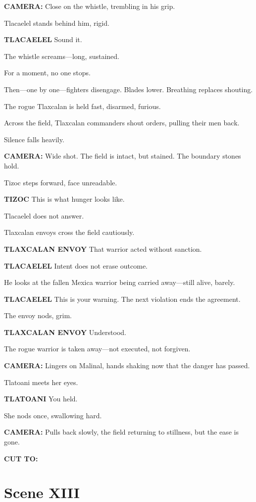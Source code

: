 \documentclass[12pt]{article}
\begin{document}
\textbf{CAMERA:} Close on the whistle, trembling in his grip.

Tlacaelel stands behind him, rigid.

\textbf{TLACAELEL}  
Sound it.

The whistle screams—long, sustained.

For a moment, no one stops.

Then—one by one—fighters disengage. Blades lower. Breathing replaces shouting.

The rogue Tlaxcalan is held fast, disarmed, furious.

Across the field, Tlaxcalan commanders shout orders, pulling their men back.

Silence falls heavily.

\textbf{CAMERA:} Wide shot. The field is intact, but stained. The boundary stones hold.

Tizoc steps forward, face unreadable.

\textbf{TIZOC}  
This is what hunger looks like.

Tlacaelel does not answer.

Tlaxcalan envoys cross the field cautiously.

\textbf{TLAXCALAN ENVOY}  
That warrior acted without sanction.

\textbf{TLACAELEL}  
Intent does not erase outcome.

He looks at the fallen Mexica warrior being carried away—still alive, barely.

\textbf{TLACAELEL}  
This is your warning.  
The next violation ends the agreement.

The envoy nods, grim.

\textbf{TLAXCALAN ENVOY}  
Understood.

The rogue warrior is taken away—not executed, not forgiven.

\textbf{CAMERA:} Lingers on Malinal, hands shaking now that the danger has passed.

Tlatoani meets her eyes.

\textbf{TLATOANI}  
You held.

She nods once, swallowing hard.

\textbf{CAMERA:} Pulls back slowly, the field returning to stillness, but the ease is gone.

\textbf{CUT TO:}

\section*{Scene XIII}
\end{document}
